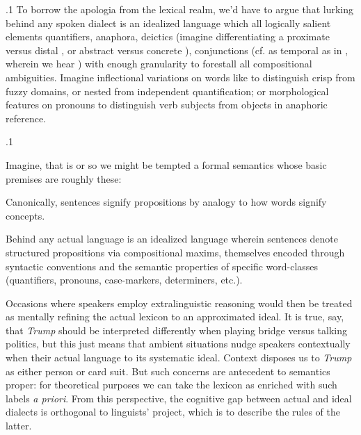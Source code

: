 \documentclass[11pt, twocolumn]{article}
\begin{document}
\p.1{%
\:\+To borrow the apologia from the lexical realm, we'd have to argue that
lurking behind any spoken dialect is an idealized language
which \pgl{} all logically salient elements \mdash{} quantifiers, anaphora, deictics
(imagine differentiating a proximate versus distal , or abstract versus concrete
),
conjunctions (cf.  as temporal as in ,
wherein we hear ) \mdash{} with enough granularity to forestall
all compositional ambiguities. \> Imagine inflectional variations
on words like  to distinguish crisp from fuzzy domains, or nested from
independent quantification; or morphological features on pronouns to
distinguish verb subjects from objects in anaphoric reference.\<\;
} %

\p.1{%
Imagine, that is \mdash{} or so we might be tempted \mdash{} a formal semantics whose basic premises are roughly these:\< \vspace{-22pt}

\begin{enums}

\enumsItem{}   \+Canonically, sentences signify propositions \mdash{} by analogy to how words signify concepts.\<
 
\enumsItem{}   \+Behind any actual language is an idealized language wherein sentences denote
structured propositions via compositional maxims, themselves encoded through
syntactic conventions and the semantic properties of specific word-classes
(quantifiers, pronouns, case-markers, determiners, etc.).\<

\end{enums}

\nip{}%
\+Occasions where speakers employ extralinguistic reasoning
would then be treated as mentally refining the
actual lexicon to an approximated ideal. \> It is true, say, that \textit{Trump} should be interpreted differently
when playing bridge versus talking politics, but this just means that
ambient situations nudge speakers contextually when 
their actual language to its systematic ideal. \> Context
disposes us to  \textit{Trump} as either person or card
suit. \> But such concerns are antecedent to semantics proper: for theoretical
purposes we can take the lexicon as enriched with such labels \textit{a priori}. \> From this perspective, the cognitive gap between
actual and ideal dialects is orthogonal to linguists'
project, which is to describe the rules of the latter.\<\;
} %
\end{document}

